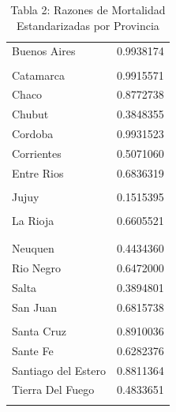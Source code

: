 \documentclass[
]{article}
\begin{document}
\begin{longtable}[l]{lr}
\caption{\label{tab:unnamed-chunk-7}Tabla 2: Razones de Mortalidad Estandarizadas por Provincia}\\
\toprule
\cellcolor{steelblue}{\textcolor{black}{Provincia}} & \cellcolor{steelblue}{\textcolor{black}{RME}}\\
\midrule
Buenos Aires & 0.9938174\\
\cellcolor{lightblue}{\textcolor{black}{C.A.B.A.}} & \cellcolor{lightblue}{\textcolor{black}{1.5126843}}\\
Catamarca & 0.9915571\\
Chaco & 0.8772738\\
Chubut & 0.3848355\\
\addlinespace
Cordoba & 0.9931523\\
Corrientes & 0.5071060\\
Entre Rios & 0.6836319\\
\cellcolor{lightblue}{\textcolor{black}{Formosa}} & \cellcolor{lightblue}{\textcolor{black}{1.5334733}}\\
Jujuy & 0.1515395\\
\addlinespace
\cellcolor{lightblue}{\textcolor{black}{La Pampa}} & \cellcolor{lightblue}{\textcolor{black}{1.1036673}}\\
La Rioja & 0.6605521\\
\cellcolor{lightblue}{\textcolor{black}{Mendoza}} & \cellcolor{lightblue}{\textcolor{black}{1.0386637}}\\
\cellcolor{lightblue}{\textcolor{black}{Misiones}} & \cellcolor{lightblue}{\textcolor{black}{3.1635893}}\\
Neuquen & 0.4434360\\
\addlinespace
Rio Negro & 0.6472000\\
Salta & 0.3894801\\
San Juan & 0.6815738\\
\cellcolor{lightblue}{\textcolor{black}{San Luis}} & \cellcolor{lightblue}{\textcolor{black}{1.1162325}}\\
Santa Cruz & 0.8910036\\
\addlinespace
Sante Fe & 0.6282376\\
Santiago del Estero & 0.8811364\\
Tierra Del Fuego & 0.4833651\\
\cellcolor{lightblue}{\textcolor{black}{Tucuman}} & \cellcolor{lightblue}{\textcolor{black}{1.3173715}}\\
\bottomrule
\end{longtable}
\end{document}
